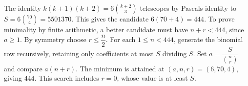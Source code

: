 The identity $k(k+1)(k+2)=6\binom{k+2}3$ telescopes by Pascal\textquotesingle s identity to $S=6\binom{70}4=5501370$. This gives the candidate $6(70+4)=444$. To prove minimality by finite arithmetic, a better candidate must have $n+r<444$, since $a\ge1$. By symmetry choose $r\le\dfrac{n}{2}$. For each $1\le n<444$, generate the binomial row recursively, retaining only coefficients at most $S$ dividing $S$. Set $a=\dfrac{S}{\binom nr}$ and compare $a(n+r)$. The minimum is attained at $(a,n,r)=(6,70,4)$, giving $\boxed{444}$. This search includes $r=0$, whose value is at least $S$.
